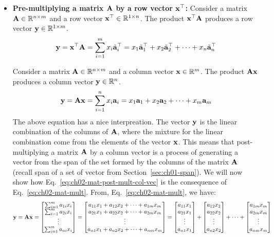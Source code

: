 \begin{itemize}
    \item \textbf{Pre-multiplying a matrix $\mathbf{A}$ by a row vector $\mathbf{x}^\top$:} Consider a matrix $\mathbf{A} \in \mathbb{R}^{n \times m}$ and a row vector $\mathbf{x}^\top \in \mathbb{R}^{1 \times n}$. The product $\mathbf{x}^\top\mathbf{A}$ produces a row vector $\mathbf{y} \in \mathbb{R}^{1 \times m}$. 
    \begin{equation}
        \mathbf{y} = \mathbf{x}^\top\mathbf{A} = \sum_{i=1}^m x_i\tilde{\mathbf{a}}_i^\top = x_1 \tilde{\mathbf{a}}_1^\top + x_2 \tilde{\mathbf{a}}_2^\top + \cdots + x_n\tilde{\mathbf{a}}_n^\top
        \label{eq:ch02-mat-pre-mult-row-vec}
    \end{equation}
    
    
    
    Consider a matrix $\mathbf{A} \in \mathbb{R}^{n \times m}$ and a column vector $\mathbf{x} \in \mathbb{R}^m$. The product $\mathbf{A}\mathbf{x}$ produces a column vector $\mathbf{y} \in \mathbb{R}^n$.
    \begin{equation}
        \mathbf{y} = \mathbf{A}\mathbf{x} = \sum_{i=1}^n x_i\mathbf{a}_i = x_1 \mathbf{a}_1 + x_2 \mathbf{a}_2 + \cdots + x_m\mathbf{a}_m
        \label{eq:ch02-mat-post-mult-col-vec}
    \end{equation}
    The above equation has a nice interpreation. The vector $\mathbf{y}$ is the linear combination of the columns of $\mathbf{A}$, where the mixture for the linear combination come from the elements of the vector $\mathbf{x}$. This means that post-multiplying a matrix $\mathbf{A}$ by a column vector is a process of generating a vector from the span of the set formed by the columns of the matrix $\mathbf{A}$ (recall span of a set of vector from Section~\ref{sec:ch01-span}). We will now show how Eq.~\ref{eq:ch02-mat-post-mult-col-vec} is the consequence of Eq.~\ref{eq:ch02-mat-mult}. From, Eq.~\ref{eq:ch02-mat-mult}, we have:
    \[ \begin{split}
        \mf{y} &= \mf{A}\mf{x} = \bmxc \sum_{i=1}^m a_{1i}x_i \\ \sum_{i=1}^m a_{2i}x_i \\ \vdots \\ \sum_{i=1}^m a_{ni}x_i \emx = \bmxc a_{11}x_1 + a_{12}x_2 + \cdots + a_{1m}x_m \\ a_{21}x_1 + a_{22}x_2 + \cdots + a_{2m}x_m \\ \vdots \\ a_{n1}x_1 + a_{n2}x_2 + \cdots + a_{nm}x_m \emx = \bmxc a_{11}x_1 \\ a_{21}x_1 \\ \vdots \\ a_{n1}x_1\emx + \bmxc a_{12}x_2 \\ a_{22}x_2 \\ \vdots \\ a_{n2}x_2\emx + \cdots + \bmxc a_{1m}x_m \\ a_{2m}x_m \\ \vdots \\ a_{nm}x_m \emx \\

\end{split}\]
\end{itemize}
